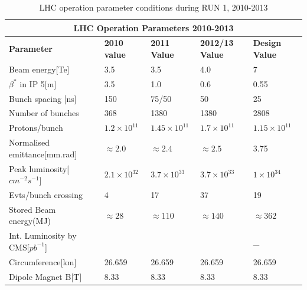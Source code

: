 \begin{center}
 \begin{table}[H]
  \begin{turn}{90}
  \centering
  \begin{tabular}{l|l|l|l|l}
  \multicolumn{5}{c}{\bfseries{LHC Operation Parameters 2010-2013}} \\
  \hline
  \toprule
  \bfseries{Parameter} & \bfseries{2010 value} & \bfseries{2011 Value} & \bfseries{2012/13 Value} & \bfseries{Design Value} \\
   \hline \hline
   Beam energy[Te] & 3.5  & 3.5  & 4.0  & 7 \\ 
  \hline
  $\beta^{\ast}$ in IP 5[m] & 3.5 & 1.0 & 0.6  & 0.55 \\
  \hline
   Bunch spacing [ns]& 150 & 75/50 & 50 & 25 \\
  \hline
  Number of bunches & 368 & 1380 & 1380 & 2808 \\
  \hline
  Protons/bunch  & $1.2 \times 10^{11}$ & $1.45 \times 10^{11}$ &  $1.7 \times 10^{11}$& $1.15 \times 10^{11}$ \\
  \hline
  Normalised emittance[mm.rad] & $\approx 2.0$ & $\approx 2.4$ & $\approx 2.5$ &  3.75\\
  \hline
  Peak luminosity[$cm^{-2}s^{-1}$]& $2.1 \times 10^{32}$ & $3.7 \times 10^{33}$ & $3.7 \times 10^{33}$ & $1 \times 10^{34}$ \\
  \hline
  Evts/bunch crossing & 4 & 17 & 37 &  19 \\
  \hline
  Stored Beam energy(MJ)& $\approx 28$ &  $\approx 110$  & $\approx 140$  & $\approx 362$ \\
  \hline
  Int. Luminosity by CMS[$pb^{-1}$]&  &  &  &  \_ \\
 \hline
 Circumference[km]  &26.659 & 26.659 & 26.659 & 26.659 \\
 \hline
 Dipole Magnet B[T] & 8.33 & 8.33 & 8.33 & 8.33 \\
 \hline  
  \bottomrule
  \end{tabular}
   \caption{LHC operation parameter conditions during RUN 1, 2010-2013}
   \label{tab:tableLHC}
   \end{turn}
  \end{table}
\end{center}



